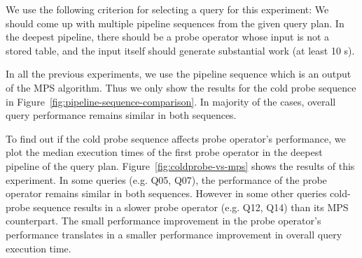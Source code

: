 We use the following criterion for selecting a query for this experiment:
We should come up with multiple pipeline sequences from the given query plan.
In the deepest pipeline, there should be a probe operator whose input is not a stored table, and the input itself should generate substantial work (at least 10 \wo{}s). 

In all the previous experiments, we use the pipeline sequence which is an output of the MPS algorithm. 
Thus we only show the results for the cold probe sequence in Figure~\ref{fig:pipeline-sequence-comparison}. 
In majority of the cases, overall query performance remains similar in both sequences.

To find out if the cold probe sequence affects probe operator's performance, we plot the median execution times of the first probe operator in the deepest pipeline of the query plan. 
Figure~\ref{fig:coldprobe-vs-mps} shows the results of this experiment. 
In some queries (e.g. Q05, Q07), the performance of the probe operator remains similar in both sequences. 
However in some other queries cold-probe sequence results in a slower probe operator (e.g. Q12, Q14) than its MPS counterpart. %
The small performance improvement in the probe operator's performance translates in a smaller performance improvement in overall query execution time.
